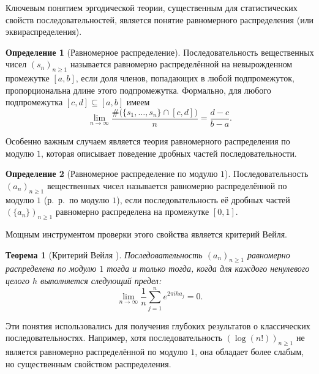 \documentclass[a4paper,14pt]{extreport}
\theoremstyle{plain}
\newtheorem{theorem}{Теорема}[section]
\theoremstyle{definition}
\newtheorem{definition}{Определение}[section]
\theoremstyle{remark}
\begin{document}
Ключевым понятием эргодической теории, существенным для статистических свойств последовательностей, является понятие равномерного распределения (или эквираспределения).

\begin{definition}[Равномерное распределение]
	Последовательность вещественных чисел $(s_{n})_{n \geq 1}$ называется равномерно распределённой на невырожденном промежутке $[a,b]$, если доля членов, попадающих в любой подпромежуток, пропорциональна длине этого подпромежутка. Формально, для любого подпромежутка $[c,d] \subseteq [a,b]$ имеем
	\begin{equation}
		\lim_{n \to \infty} \frac{\#\bigl(\{s_{1},\dots,s_{n}\} \cap [c,d]\bigr)}{n}
		= \frac{d-c}{b-a}.
	\end{equation}
\end{definition}

Особенно важным случаем является теория равномерного распределения по модулю $1$, которая описывает поведение дробных частей последовательности. 

\begin{definition}[Равномерное распределение по модулю $1$]
	Последовательность $(a_n)_{n \geq 1}$ вещественных чисел называется равномерно распределённой по модулю $1$ (р.~р.\ по модулю $1$), если последовательность её дробных частей $(\{a_n\})_{n \geq 1}$ равномерно распределена на промежутке $[0,1]$.
\end{definition}

Мощным инструментом проверки этого свойства является критерий Вейля.

\begin{theorem}[Критерий Вейля {\cite{Kuipers}}]
	Последовательность $(a_n)_{n \geq 1}$ равномерно распределена по модулю $1$ тогда и только тогда, когда для каждого ненулевого целого $h$ выполняется следующий предел:
	\begin{equation}
		\lim_{n \to \infty} \frac{1}{n} \sum_{j=1}^{n} e^{2 \pi i h a_{j}} = 0.
	\end{equation}
\end{theorem}

Эти понятия использовались для получения глубоких результатов о классических последовательностях. Например, хотя последовательность $(\log(n!))_{n \geq 1}$ не является равномерно распределённой по модулю $1$, она обладает более слабым, но существенным свойством распределения.
\end{document}
